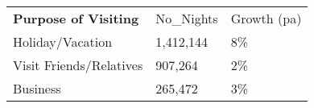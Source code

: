 \begin{tabular}[t]{p{5cm}p{1.3cm}p{1.2cm}}
 \textbf{Purpose of Visiting} & No\_Nights & Growth (pa) \\ 
 Holiday/Vacation & 1,412,144 & 8\% \\ 
  Visit Friends/Relatives &   907,264 & 2\% \\ 
  Business &   265,472 & 3\% \\ 
  \end{tabular}
